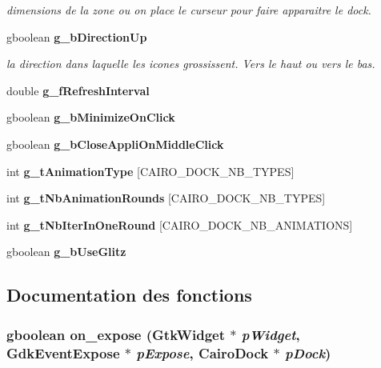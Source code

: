 \begin{CompactItemize}
\begin{CompactList}\small\item\em dimensions de la zone ou on place le curseur pour faire apparaitre le dock. \item\end{CompactList}\item 
gboolean {\bf g\_\-b\-Direction\-Up}
\begin{CompactList}\small\item\em la direction dans laquelle les icones grossissent. Vers le haut ou vers le bas. \item\end{CompactList}\item 
double {\bf g\_\-f\-Refresh\-Interval}
\item 
gboolean {\bf g\_\-b\-Minimize\-On\-Click}
\item 
gboolean {\bf g\_\-b\-Close\-Appli\-On\-Middle\-Click}
\item 
int {\bf g\_\-t\-Animation\-Type} [CAIRO\_\-DOCK\_\-NB\_\-TYPES]
\item 
int {\bf g\_\-t\-Nb\-Animation\-Rounds} [CAIRO\_\-DOCK\_\-NB\_\-TYPES]
\item 
int {\bf g\_\-t\-Nb\-Iter\-In\-One\-Round} [CAIRO\_\-DOCK\_\-NB\_\-ANIMATIONS]
\item 
gboolean {\bf g\_\-b\-Use\-Glitz}
\end{CompactItemize}


\subsection{Documentation des fonctions}
\subsubsection{\setlength{\rightskip}{0pt plus 5cm}gboolean on\_\-expose (Gtk\-Widget $\ast$ {\em p\-Widget}, Gdk\-Event\-Expose $\ast$ {\em p\-Expose}, {\bf Cairo\-Dock} $\ast$ {\em p\-Dock})}\label{cairo-dock-callbacks_8c_edbc97fc4750f7b2ebe5f038b27e8fe0}



